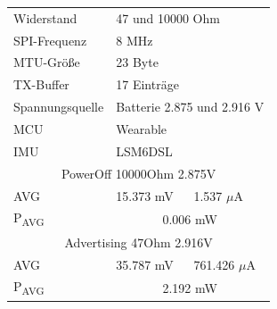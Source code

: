 \begin{figure}[!hbtp]
\begin{minipage}{0.5\textwidth}
\begin{tabular}{|l|l|l|}
      \hline
    \end{tabular}
    \label{tab:test5}
  \end{minipage}
  \begin{minipage}{0.5\textwidth}
    \centering
    \begin{tabular}{|l|l|l|}
      \hline
      Widerstand & \multicolumn{2}{l|}{47 und 10000 Ohm}\\
      SPI-Frequenz & \multicolumn{2}{l|}{8 MHz}\\
      MTU-Größe & \multicolumn{2}{l|}{23 Byte}\\
      TX-Buffer & \multicolumn{2}{l|}{17 Einträge}\\
      Spannungsquelle & \multicolumn{2}{l|}{Batterie 2.875 und 2.916 V}\\
      MCU & \multicolumn{2}{l|}{Wearable}\\
      IMU & \multicolumn{2}{l|}{LSM6DSL}\\
      \hline
      \multicolumn{3}{|c|}{PowerOff 10000Ohm 2.875V}\\
      AVG & 15.373 mV & 1.537 $\mu$A\\
      P\textsubscript{AVG} & \multicolumn{2}{c|}{0.006 mW}\\
      \hline
      \multicolumn{3}{|c|}{Advertising 47Ohm 2.916V}\\
      AVG & 35.787 mV & 761.426 $\mu$A\\
      P\textsubscript{AVG} & \multicolumn{2}{c|}{2.192 mW}\\
      \hline
    \end{tabular}
    \label{tab:test6}
  \end{minipage}
\end{figure}

